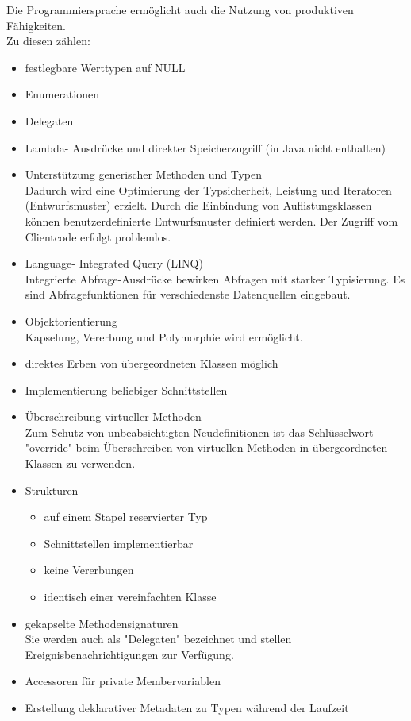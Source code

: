 \documentclass[12pt,a4paper]{report}
\begin{document}
\begin{onehalfspace}
Die Programmiersprache ermöglicht auch die Nutzung von produktiven Fähigkeiten.
\\Zu diesen zählen:
\begin{itemize}
\item festlegbare Werttypen auf NULL
\item Enumerationen
\item Delegaten
\item Lambda- Ausdrücke und direkter Speicherzugriff (in Java nicht enthalten)
\item Unterstützung generischer Methoden und Typen\\
Dadurch wird eine Optimierung der Typsicherheit, Leistung und Iteratoren (Entwurfsmuster) erzielt. Durch die Einbindung von Auflistungsklassen können benutzerdefinierte Entwurfsmuster definiert werden. Der Zugriff vom Clientcode erfolgt problemlos.
\item Language- Integrated Query (LINQ)\\
Integrierte Abfrage-Ausdrücke bewirken Abfragen mit starker Typisierung. Es sind Abfragefunktionen für verschiedenste Datenquellen eingebaut.
\item Objektorientierung\\
Kapselung, Vererbung und Polymorphie wird ermöglicht.
\item direktes Erben von übergeordneten Klassen möglich
\item Implementierung beliebiger Schnittstellen
\item Überschreibung virtueller Methoden\\
Zum Schutz von unbeabsichtigten Neudefinitionen ist das Schlüsselwort "{}override"{} beim Überschreiben von virtuellen Methoden in übergeordneten Klassen zu verwenden.
\item  Strukturen
\begin{itemize}
\item auf einem Stapel reservierter Typ
\item Schnittstellen implementierbar
\item keine Vererbungen
\item identisch einer vereinfachten Klasse
\end{itemize}
\item gekapselte Methodensignaturen\\
Sie werden auch als "{}Delegaten"{} bezeichnet und stellen Ereignisbenachrichtigungen zur Verfügung.
\item Accessoren für private Membervariablen
\item Erstellung deklarativer Metadaten zu Typen während der Laufzeit

\end{itemize}
\end{onehalfspace}
\end{document}
